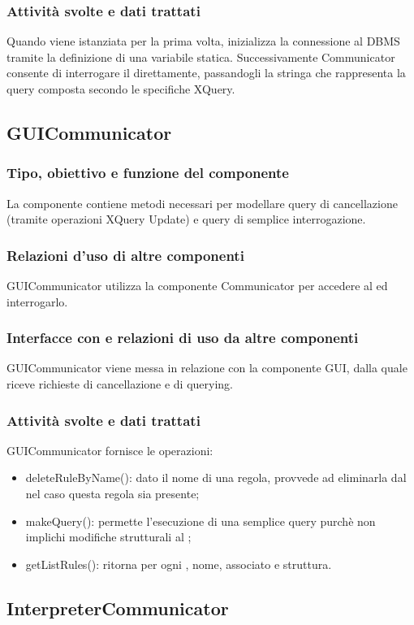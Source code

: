 \documentclass[11pt,titlepage,a4paper]{report}
\begin{document}
\subsubsection{Attivit\`a svolte e dati trattati}
Quando viene istanziata per la prima volta, inizializza la connessione al DBMS tramite la definizione di una variabile statica. Successivamente Communicator consente di interrogare il \re direttamente, passandogli la stringa che rappresenta la query composta secondo le specifiche XQuery.
%
\subsection{GUICommunicator}
\subsubsection{Tipo, obiettivo e funzione del componente}
La componente contiene metodi necessari per modellare query di cancellazione (tramite operazioni XQuery Update) e query di semplice interrogazione.
\subsubsection{Relazioni d'uso di altre componenti}
GUICommunicator utilizza la componente Communicator per accedere al \re ed interrogarlo.
\subsubsection{Interfacce con e relazioni di uso da altre componenti}
GUICommunicator viene messa in relazione con la componente GUI, dalla quale riceve richieste di cancellazione e di querying.
\subsubsection{Attivit\`a svolte e dati trattati}
GUICommunicator fornisce le operazioni:
\begin{itemize}
 \item deleteRuleByName(): dato il nome di una regola, provvede ad eliminarla dal \re nel caso questa regola sia presente;
 \item makeQuery(): permette l'esecuzione di una semplice query purch\`e non implichi modifiche strutturali al \re;
 \item getListRules(): ritorna per ogni \br, nome, \bo associato e struttura.
\end{itemize}
\subsection{InterpreterCommunicator}
\end{document}
